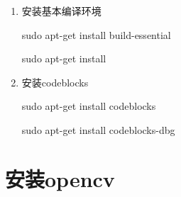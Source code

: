 \documentclass[12pt]{article}
\begin{document}
\begin{enumerate}

\item 安装基本编译环境

sudo apt-get install build-essential

sudo apt-get install

\item 安装codeblocks

sudo apt-get install codeblocks

sudo apt-get install codeblocks-dbg

\begin{comment}

wxWidgets 工具包提供图形用户界面（GUI）开发所需的一些功能强大的跨平台工具。除了原生的 C++, 还有其他几种语言提供了使用该工具包所需的包装程序。我们一般用不到，可以先不装

sudo apt-get install wxformbuilder

\item 安装wxWidgets

sudo apt-get install libwxbase2.8

sudo apt-get install libwxbase2.8-dev

sudo apt-get install libwxgtk2.8-0

sudo apt-get install libwxgtk2.8-dev

sudo apt-get install libwxgtk2.8-dbg

sudo apt-get install wx-common

sudo apt-get install wx2.8-headers

sudo apt-get install wx2.8-i18n

wx2.8-examples和wx2.8-doc想看文档可以装上

\item 配置codeblocks

打开codeblocks

settings->global variables

current variable标签后面点击new按钮，出来的框框填写wx

然后 built-in fields下面

base /usr

include /usr/include/wx-2.8

lib /usr/lib

点击close保存
 
\end{comment}

\end{enumerate}

\section{安装opencv}
\end{document}
